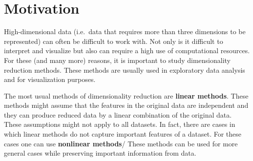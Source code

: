 \section{Motivation}\label{sec:motivation}
High-dimensional data (i.e.\ data that requires more than three dimensions to be represented) can often be difficult to work with. Not only is it difficult to interpret and visualize but also can require a high use of computational resources. For these (and many more) reasons, it is important to study dimensionality reduction methods. These methods are usually used in exploratory data analysis and for visualization purposes.

The most usual methods of dimensionality reduction are \textbf{linear methods}. These methods might assume that the features in the original data are independent and they can produce reduced data by a linear combination of the original data. These assumptions might not apply to all datasets. In fact, there are cases in which linear methods do not capture important features of a dataset. For these cases one can use \textbf{nonlinear methods}/ These methods can be used for more general cases while preserving important information from data.

